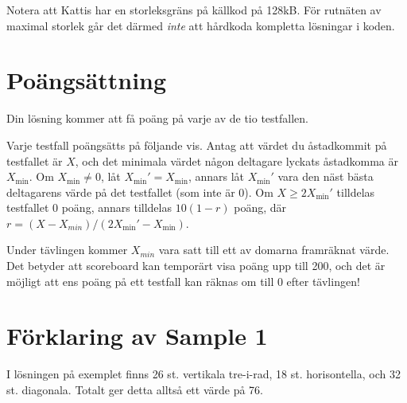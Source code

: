 Notera att Kattis har en storleksgräns på källkod på 128kB. För rutnäten av maximal storlek går det därmed
\emph{inte} att hårdkoda kompletta lösningar i koden.

\section*{Poängsättning}
Din lösning kommer att få poäng på varje av de tio testfallen.

Varje testfall poängsätts på följande vis.
Antag att värdet du åstadkommit på testfallet är $X$, och
det minimala värdet någon deltagare lyckats åstadkomma är $X_{\min}$.
Om $X_{\min} \ne 0$, låt $X_{\min}' = X_{\min}$, annars låt $X_{\min}'$ vara den näst bästa deltagarens värde på det testfallet (som inte är 0).
Om $X \ge 2X_{\min}'$ tilldelas testfallet $0$ poäng, annars tilldelas $10(1 - r)$ poäng, där $r = (X - X_{min}) / (2X_{\min}' - X_{\min})$.

Under tävlingen kommer $X_{min}$ vara satt till ett av domarna framräknat värde.
Det betyder att scoreboard kan temporärt visa poäng upp till 200, och det är möjligt att ens poäng på ett testfall kan räknas om till 0 efter tävlingen!

\section*{Förklaring av Sample 1}
I lösningen på exemplet finns 26 st. vertikala tre-i-rad, 18 st. horisontella, och 32 st. diagonala.
Totalt ger detta alltså ett värde på 76.
